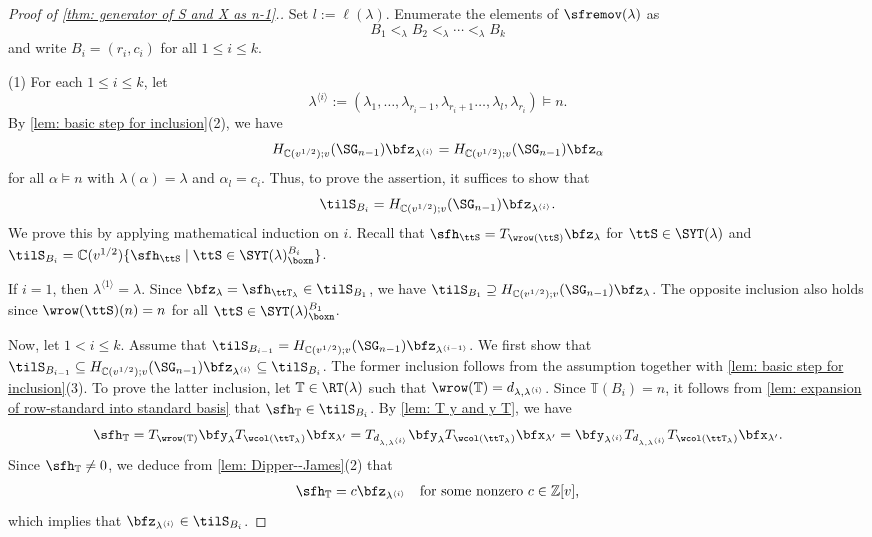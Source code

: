 \documentclass[12pt, reqno]{amsart}
\theoremstyle{plain}
\theoremstyle{definition}
\numberwithin{equation}{section}
\numberwithin{figure}{section}
\numberwithin{table}{section}
\def\Z{\mathbb Z}
\def\C{\mathbb C}
\begin{document}
\begin{proof}[Proof of \protect\cref{thm: generator of S and X as n-1}.]
Set $l := \ell(\lambda)$.
Enumerate the elements of $\sfremov(\lambda)$ as 
$$ 
B_1 <_{\lambda} B_2 <_{\lambda} \cdots <_{\lambda} B_k 
$$
and write $B_i = (r_i, c_i)$ for all $1 \leq i \leq k$.


(1) For each $1 \leq i \leq k$,  let 
\[
\lambda^{\langle i \rangle} := (\lambda_1,  \ldots, {\lambda}_{r_i - 1}, {\lambda}_{r_i + 1}\ldots, \lambda_l, \lambda_{r_i}) \models n.
\]
By \cref{lem: basic step for inclusion}(2),  we have 
\begin{align*}
H_{\C(v^{1/2});v}(\SG_{n-1})\bfz_{\lambda^{\langle i \rangle}} = H_{\C(v^{1/2});v}(\SG_{n-1})\bfz_{\alpha} 
\end{align*}
for all  $\alpha \models n$ with $\lambda(\alpha) = \lambda$ and $\alpha_l = c_i$.
Thus, to prove the assertion, it suffices to show that 
\begin{align}\label{eq: H z lam i SBi}
\tilS_{B_i} = H_{\C(v^{1/2});v}(\SG_{n-1})\bfz_{\lambda^{\langle i \rangle}}.
\end{align}
We prove this by applying mathematical induction on $i$.
Recall that $\sfh_{\ttS} = T_{\wrow(\ttS)} \bfz_{\lambda}$ for  $\ttS \in \SYT(\lambda)$ and $\tilS_{B_i} = \C(v^{1/2})  \{\sfh_{\ttS} \mid \ttS \in \SYT(\lambda)^{B_i}_{\boxn} \}$.


If $i = 1$, then $\lambda^{\langle 1 \rangle} = \lambda$.
Since $\bfz_{\lambda} = \sfh_{\ttT_{\lambda}}  \in \tilS_{B_1}$, we have $\tilS_{B_1} \supseteq H_{\C(v^{1/2});v}(\SG_{n-1})\bfz_{\lambda}$.
The opposite inclusion also holds since $\wrow(\ttS)(n) = n$ for all $\ttS \in \SYT(\lambda)^{B_1}_{\boxn}$.

Now, let $1 < i \leq k$. 
Assume that $\tilS_{B_{i-1}} = H_{\C(v^{1/2});v}(\SG_{n-1}) \bfz_{\lambda^{\langle i-1 \rangle}}$.
We first show that $\tilS_{B_{i-1}}   \subseteq 
H_{\C(v^{1/2});v}(\SG_{n-1}) \bfz_{\lambda^{\langle i \rangle}}   \subseteq \tilS_{B_{i}}$.
The former inclusion  follows from  the assumption together with  \cref{lem: basic step for inclusion}(3).
To prove the latter inclusion, let  $\mathbb{T} \in \RT(\lambda)$ such that $\wrow(\mathbb{T}) = d_{\lambda,  \lambda^{\langle i \rangle}}$.
Since $\mathbb{T}(B_i) = n$, it follows from \cref{lem: expansion of row-standard into standard basis} that  
$\sfh_{\mathbb{T}} \in \tilS_{B_i}$.
By \cref{lem: T y and y T}, we have 
\[
\sfh_{\mathbb{T}} = T_{\wrow(\mathbb{T})}\bfy_{\lambda}T_{\wcol(\ttT_{\lambda})}\bfx_{\lambda'}  = T_{d_{\lambda,\lambda^{\langle i \rangle}}}\bfy_{\lambda}T_{\wcol(\ttT_{\lambda})}\bfx_{\lambda'} = \bfy_{\lambda^{\langle i \rangle}} T_{d_{\lambda,\lambda^{\langle i \rangle}}} T_{\wcol(\ttT_{\lambda})}\bfx_{\lambda'}.
\]
Since $\sfh_{\mathbb{T}} \neq 0$, we deduce from \cref{lem: Dipper--James}(2) that 
\begin{align}\label{eq: h and z scalar diff}
\sfh_{\mathbb{T}} = c \bfz_{\lambda^{\langle i \rangle}}
\quad \text{for some nonzero $c \in \Z[v]$,}
\end{align}
which implies that $\bfz_{\lambda^{\langle i \rangle}} \in \tilS_{B_i}$.


\end{proof}
\end{document}
